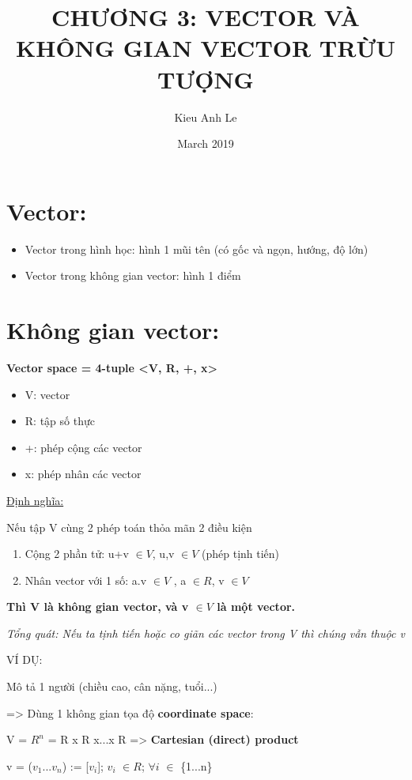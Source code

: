 \documentclass{article}
\title{CHƯƠNG 3: VECTOR VÀ KHÔNG GIAN VECTOR TRỪU TƯỢNG}
\author{Kieu Anh Le }
\date{March 2019}
\begin{document}
\maketitle

\section{Vector:}
\begin{itemize}
    \item Vector trong hình học: hình 1 mũi tên (có gốc và ngọn, hướng, độ lớn)
    \item Vector trong không gian vector: hình 1 điểm
\end{itemize}
   
\section{Không gian vector:} 
\textbf{Vector space = 4-tuple <V, R, +, x>}
\begin{itemize}
    \item V: vector
    \item R: tập số thực
    \item +: phép cộng các vector
    \item x: phép nhân các vector
\end{itemize}

\underline{Định nghĩa:}

Nếu tập V cùng 2 phép toán thỏa mãn 2 điều kiện

\begin{enumerate}
    \item Cộng 2 phần tử: u+v $\in V $, u,v $\in V$ (phép tịnh tiến)
    \item Nhân vector với 1 số: a.v $\in V $ , a $\in  R $, v $\in V $
\end{enumerate}

\textbf{Thì V là không gian vector, và v $\in V $ là một vector.}

\emph{Tổng quát: Nếu ta tịnh tiến hoặc co giãn các vector trong V thì chúng vẫn thuộc v}


\large{VÍ DỤ:}

Mô tả 1 người (chiều cao, cân nặng, tuổi...)

=> Dùng 1 không gian tọa độ \textbf{coordinate space}:

V = $R^{n}$ = R x R x...x R => \textbf{Cartesian (direct) product}

v = ($v_{1}$...$v_{n}$) := [$v_{i}$]; $v_{i}$ $\in R$; $\forall i$ $\in$
{\{1...n}\}
\end{document}

